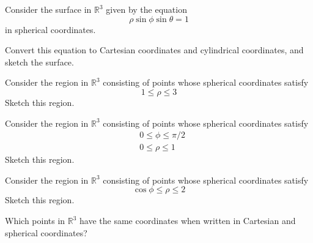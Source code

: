 \documentclass{ximera}
\begin{document}
\begin{problem}
Consider the surface in $\mathbb{R}^3$ given by the equation
\[
\rho\sin\phi\sin\theta = 1
\]
in spherical coordinates.

Convert this equation to Cartesian coordinates and cylindrical coordinates, and sketch the surface.
\end{problem}

\begin{problem}
Consider the region in $\mathbb{R}^3$ consisting of points whose spherical coordinates satisfy
\[
1\leq\rho\leq 3
\]
Sketch this region.
\end{problem}

\begin{problem}
Consider the region in $\mathbb{R}^3$ consisting of points whose spherical coordinates satisfy
\begin{align*}
&0\leq \phi\leq \pi/2\\
&0\leq \rho\leq 1
\end{align*}
Sketch this region.
\end{problem}

\begin{problem}
Consider the region in $\mathbb{R}^3$ consisting of points whose spherical coordinates satisfy
\[
\cos\phi \leq \rho \leq 2
\]
Sketch this region.
\end{problem}

\begin{problem}
Which points in $\mathbb{R}^3$ have the same coordinates when written in Cartesian and spherical coordinates?
\end{problem}
\end{document}
